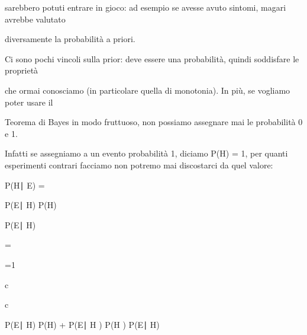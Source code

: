 \documentclass[a4paper,portrait,12pt]{article}
\begin{document}
\begin{flushleft}
sarebbero potuti entrare in gioco: ad esempio se avesse avuto sintomi, magari avrebbe valutato
\end{flushleft}


\begin{flushleft}
diversamente la probabilit\`{a} a priori.
\end{flushleft}


\begin{flushleft}
Ci sono pochi vincoli sulla prior: deve essere una probabilit\`{a}, quindi soddisfare le propriet\`{a}
\end{flushleft}


\begin{flushleft}
che ormai conosciamo (in particolare quella di monotonia). In più, se vogliamo poter usare il
\end{flushleft}


\begin{flushleft}
Teorema di Bayes in modo fruttuoso, non possiamo assegnare mai le probabilit\`{a} 0 e 1.
\end{flushleft}


\begin{flushleft}
Infatti se assegniamo a un evento probabilit\`{a} 1, diciamo P(H) = 1, per quanti esperimenti contrari facciamo non potremo mai discostarci da quel valore:
\end{flushleft}


\begin{flushleft}
P(H∣ E) =
\end{flushleft}





\begin{flushleft}
P(E∣ H) P(H)
\end{flushleft}


\begin{flushleft}
P(E∣ H)
\end{flushleft}


=


=1


\begin{flushleft}
c
\end{flushleft}


\begin{flushleft}
c
\end{flushleft}


\begin{flushleft}
P(E∣ H) P(H) + P(E∣ H ) P(H ) P(E∣ H)
\end{flushleft}
\end{document}
